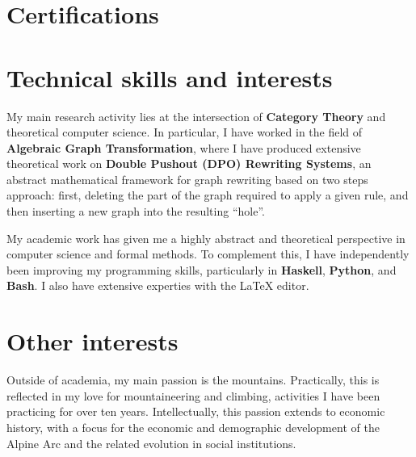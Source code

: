 \documentclass[11pt,a4paper,sans]{moderncv} %
\begin{document}

\section{Certifications}
\fi 




\section{Technical skills and interests}

\hspace{15pt}My main research activity lies at the intersection of \textbf{Category Theory} and theoretical computer science. In particular, I have worked in the field of \textbf{Algebraic Graph Transformation}, where I have produced extensive theoretical work on \textbf{Double Pushout (DPO) Rewriting Systems}, an abstract mathematical framework for graph rewriting based on two steps approach: first, deleting the part of the graph required to apply a given rule, and then inserting a new graph into the resulting ``hole''.


\hspace{15pt}My academic work has given me a highly abstract and theoretical perspective in computer science and formal methods. To complement this, I have independently been improving my programming skills, particularly in \textbf{Haskell}, \textbf{Python}, and \textbf{Bash}. I also have extensive experties with the \LaTeX{} editor.

\section{Other interests}

\hspace{15pt}Outside of academia, my main passion is the mountains. Practically, this is reflected in my love for mountaineering and climbing, activities I have been practicing for over ten years. Intellectually, this passion extends to economic history, with a focus for the economic and demographic development of the  Alpine Arc and the related evolution in social institutions.
\end{document}
